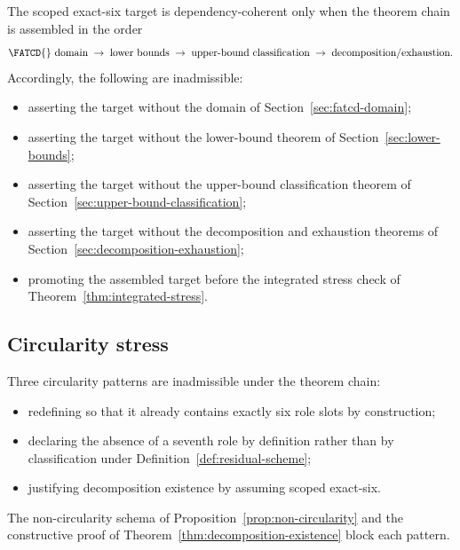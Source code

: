 \begin{proposition}\label{prop:dependency-stress}
The scoped exact-six target is dependency-coherent only when the theorem
chain is assembled in the order
\[
\text{\FATCD{} domain} \;\rightarrow\; \text{lower bounds} \;\rightarrow\;
\text{upper-bound classification} \;\rightarrow\;
\text{decomposition/exhaustion}.
\]
Accordingly, the following are inadmissible:
\begin{itemize}[topsep=2pt,itemsep=1pt]
  \item asserting the target without the \FATCD{} domain of
    Section~\ref{sec:fatcd-domain};
  \item asserting the target without the lower-bound theorem of
    Section~\ref{sec:lower-bounds};
  \item asserting the target without the upper-bound classification
    theorem of Section~\ref{sec:upper-bound-classification};
  \item asserting the target without the decomposition and exhaustion
    theorems of Section~\ref{sec:decomposition-exhaustion};
  \item promoting the assembled target before the integrated stress
    check of Theorem~\ref{thm:integrated-stress}.
\end{itemize}
\end{proposition}

\subsection{Circularity stress}\label{subsec:circularity-stress}

\begin{proposition}\label{prop:circularity-stress}
Three circularity patterns are inadmissible under the theorem chain:
\begin{itemize}[topsep=2pt,itemsep=1pt]
  \item redefining \FATCD{} so that it already contains exactly six role
    slots by construction;
  \item declaring the absence of a seventh role by definition rather
    than by classification under Definition~\ref{def:residual-scheme};
  \item justifying decomposition existence by assuming scoped
    exact-six.
\end{itemize}
The non-circularity schema of Proposition~\ref{prop:non-circularity} and
the constructive proof of Theorem~\ref{thm:decomposition-existence}
block each pattern.
\end{proposition}

